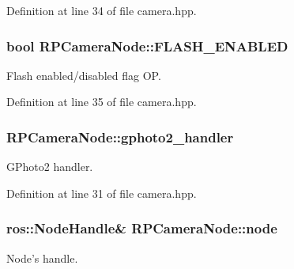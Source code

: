 \-Definition at line 34 of file camera.\-hpp.

\hypertarget{class_r_p_camera_node_af56a202a81ef4884fb5ce455bb288f42}{
\subsubsection[{\-F\-L\-A\-S\-H\-\_\-\-E\-N\-A\-B\-L\-E\-D}]{\setlength{\rightskip}{0pt plus 5cm}bool {\bf \-R\-P\-Camera\-Node\-::\-F\-L\-A\-S\-H\-\_\-\-E\-N\-A\-B\-L\-E\-D}}}\label{class_r_p_camera_node_af56a202a81ef4884fb5ce455bb288f42}
\-Flash enabled/disabled flag \-O\-P. 

\-Definition at line 35 of file camera.\-hpp.

\hypertarget{class_r_p_camera_node_a15ea1a7dedfc8bca967f1dfd67dc544f}{
\subsubsection[{gphoto2\-\_\-handler}]{ {\bf \-R\-P\-Camera\-Node\-::gphoto2\-\_\-handler}}}\label{class_r_p_camera_node_a15ea1a7dedfc8bca967f1dfd67dc544f}
\-G\-Photo2 handler. 

\-Definition at line 31 of file camera.\-hpp.

\hypertarget{class_r_p_camera_node_a258bd2f067f146b88e9f7463f3ef9f3d}{
\subsubsection[{node}]{\setlength{\rightskip}{0pt plus 5cm}ros\-::\-Node\-Handle\& {\bf \-R\-P\-Camera\-Node\-::node}}}\label{class_r_p_camera_node_a258bd2f067f146b88e9f7463f3ef9f3d}
\-Node's handle. 

